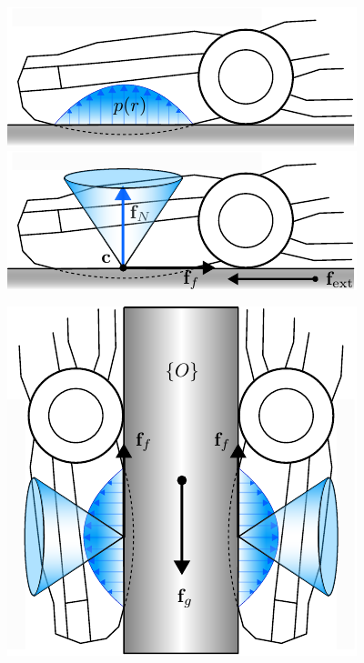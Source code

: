 \begin{center}
    \renewcommand{\arraystretch}{1.2}
    \begin{minipage}{.48\linewidth}
        \vspace{0pt}
        \centering
        \includegraphics[width=.95\textwidth]{chapters/modeling/fig/contact-surface.pdf}%
        \vspace{0.6cm}
        \includegraphics[width=.95\textwidth]{chapters/modeling/fig/friction-cone-schematic.pdf}%
    \end{minipage}%
    \hfill%
    \begin{minipage}{.48\linewidth}
        \vspace{0pt}
        \centering
        \includegraphics[width=.95\textwidth]{chapters/modeling/fig/force-closure-contact.pdf}

\end{minipage}
\end{center}
